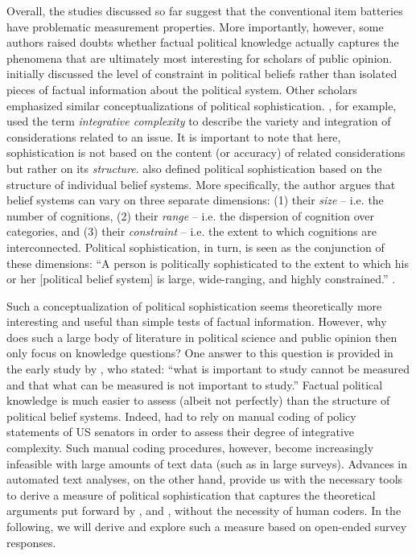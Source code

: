 \documentclass[12pt]{article}
\begin{document}
Overall, the studies discussed so far suggest that the conventional item batteries have problematic measurement properties. More importantly, however, some authors raised doubts whether factual political knowledge actually captures the phenomena that are ultimately most interesting for scholars of public opinion. \citet{converse1964nature} initially discussed the level of constraint in political beliefs rather than isolated pieces of factual information about the political system. Other scholars emphasized similar conceptualizations of political sophistication. \citet{tetlock1983cognitive}, for example, used the term \textit{integrative complexity} to describe the variety and integration of considerations related to an issue. It is important to note that here, sophistication is not based on the content (or accuracy) of related considerations but rather on its \textit{structure}. \citet{luskin1987measuring} also defined political sophistication based on the structure of individual belief systems. More specifically, the author argues that belief systems can vary on three separate dimensions: (1) their \textit{size} -- i.e. the number of cognitions, (2) their \textit{range} -- i.e. the dispersion of cognition over categories, and (3) their \textit{constraint} -- i.e. the extent to which cognitions are interconnected. Political sophistication, in turn, is seen as the conjunction of these dimensions: ``A person is politically sophisticated to the extent to which his or her [political belief system] is large, wide-ranging, and highly constrained.'' \citep[860]{luskin1987measuring}.

Such a conceptualization of political sophistication seems theoretically more interesting and useful than simple tests of factual information. However, why does such a large body of literature in political science and public opinion then only focus on knowledge questions? One answer to this question is provided in the early study by \citet[206]{converse1964nature}, who stated: ``what is important to study cannot be measured and that what can be measured is not important to study.'' Factual political knowledge is much easier to assess (albeit not perfectly) than the structure of political belief systems. Indeed, \citet{tetlock1983cognitive} had to rely on manual coding of policy statements of US senators in order to assess their degree of integrative complexity. Such manual coding procedures, however, become increasingly infeasible with large amounts of text data (such as in large surveys). Advances in automated text analyses, on the other hand, provide us with the necessary tools to derive a measure of political sophistication that captures the theoretical arguments put forward by \citet{converse1964nature}, \citet{tetlock1983cognitive} and \citet{luskin1987measuring}, without the necessity of human coders. In the following, we will derive and explore such a measure based on open-ended survey responses.
\end{document}
